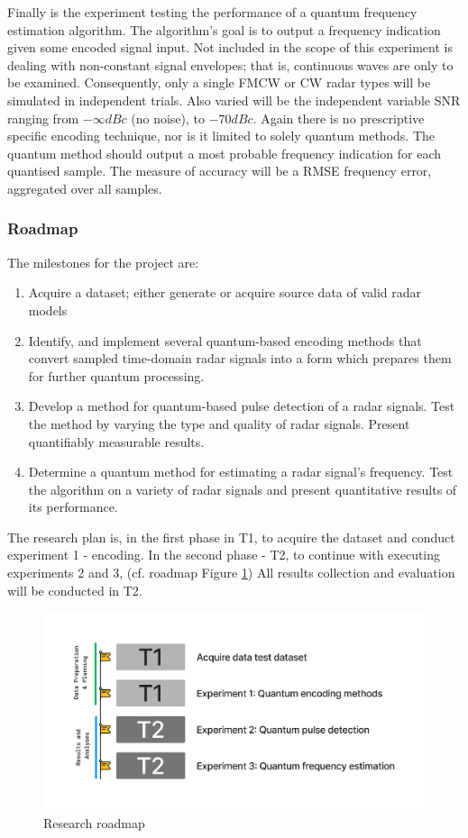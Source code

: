 Finally is the experiment testing the performance of a quantum frequency estimation algorithm.
The algorithm's goal is to output a frequency indication given some encoded signal input.
Not included in the scope of this experiment is dealing with non-constant signal envelopes; that is, continuous waves are only to be examined.
Consequently, only a single \ac{FMCW} or \ac{CW} radar types will be simulated in independent trials.
Also varied will be the independent variable \ac{SNR} ranging from $-\infty dBc$ (no noise), to $-70dBc$.
Again there is no prescriptive specific encoding technique, nor is it limited to solely quantum
methods.
The quantum method should output a most probable frequency indication for each quantised sample.
The measure of accuracy will be a \ac{RMSE} frequency error, aggregated over all samples. 


\subsubsection{Roadmap}
The milestones for the project are:
\begin{enumerate}
    \item Acquire a dataset; either generate or acquire source data of valid radar models
    \item Identify, and implement several quantum-based encoding methods that convert sampled time-domain radar signals into a form which prepares them for further quantum processing.
    \item Develop a method for quantum-based pulse detection of a radar signals. Test the method by varying the type and quality of radar signals. Present quantifiably measurable results.
    \item Determine a quantum method for estimating a radar signal’s frequency. Test the algorithm on a variety of radar signals and present quantitative results of its performance.
\end{enumerate}

The research plan is, in the first phase in T1, to acquire the dataset and conduct experiment 1 - encoding.
In the second phase - T2, to continue with executing experiments 2 and 3, (cf. roadmap Figure \ref{fig:roadmap})
All results collection and evaluation will be conducted in T2.

\begin{figure}[ht]
    \centering
    \includegraphics[width=1\textwidth]{Figures/roadmap.png}
    \caption{Research roadmap}
    \label{fig:roadmap}
\end{figure}

